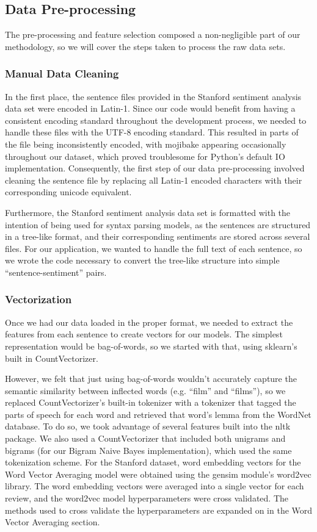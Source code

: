 \documentclass[conference]{IEEEtran}
\begin{document}
\subsection{Data Pre-processing}

The pre-processing and feature selection composed a non-negligible part of our methodology, so we will cover the steps taken to process the raw data sets. 

\subsubsection{Manual Data Cleaning}

In the first place, the sentence files provided in the Stanford sentiment analysis data set were encoded in Latin-1. Since our code would benefit from having a consistent encoding standard throughout the development process, we needed to handle these files with the UTF-8 encoding standard. This resulted in parts of the file being inconsistently encoded, with mojibake appearing occasionally throughout our dataset, which proved troublesome for Python's default IO implementation. Consequently, the first step of our data pre-processing involved cleaning the sentence file by replacing all Latin-1 encoded characters with their corresponding unicode equivalent.

Furthermore, the Stanford sentiment analysis data set is formatted with the intention of being used for syntax parsing models, as the sentences are structured in a tree-like format, and their corresponding sentiments are stored across several files. For our application, we wanted to handle the full text of each sentence, so we wrote the code necessary to convert the tree-like structure into simple ``sentence-sentiment'' pairs.

\subsubsection{Vectorization}

Once we had our data loaded in the proper format, we needed to extract the features from each sentence to create vectors for our models. The simplest representation would be bag-of-words, so we started with that, using sklearn's built in CountVectorizer.

However, we felt that just using bag-of-words wouldn't accurately capture the semantic similarity between inflected words (e.g. ``film'' and ``films''), so we replaced CountVectorizer's built-in tokenizer with a tokenizer that tagged the parts of speech for each word and retrieved that word's lemma from the WordNet database. To do so, we took advantage of several features built into the nltk package. We also used a CountVectorizer that included both unigrams and bigrams (for our Bigram Naive Bayes implementation), which used the same tokenization scheme. For the Stanford dataset, word embedding vectors for the Word Vector Averaging model were obtained using the gensim module's word2vec library. The word embedding vectors were averaged into a single vector for each review, and the word2vec model hyperparameters were cross validated. The methods used to cross validate the hyperparameters are expanded on in the Word Vector Averaging section.
\end{document}
